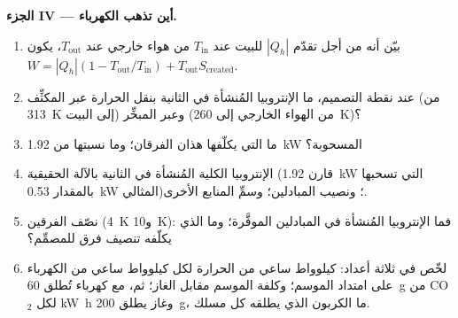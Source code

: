 \begin{problem}
\medskip
\noindent\textbf{الجزء IV --- أين تذهب الكهرباء.}
\begin{enumerate}[resume]
  \item بيّن أنه من أجل  تقدّم $|Q_h|$ للبيت عند
        $T_{\mathrm{in}}$ من هواء خارجي عند $T_{\mathrm{out}}$، يكون
        $W = |Q_h|(1 - T_{\mathrm{out}}/T_{\mathrm{in}}) + T_{\mathrm{out}}S_{\mathrm{created}}$.
  \item عند نقطة التصميم، ما الإنتروبيا المُنشأة في الثانية بنقل
        الحرارة عبر المكثِّف (من \qty{313}{K} إلى البيت)
        وعبر المبخِّر (من الهواء الخارجي إلى \qty{260}{K})؟
  \item ما  التي يكلّفها هذان الفرقان؛ وما نسبتها من
        \qty{1.92}{kW} المسحوبة؟
  \item الإنتروبيا الكلية المُنشأة في الثانية بالآلة الحقيقية (قارن
        \qty{1.92}{kW} التي تسحبها بالمقدار \qty{0.53}{kW} المثالي)؛ ونصيب
        المبادلين؛ وسمِّ المنابع الأخرى.
  \item نصّف الفرقين (\qty{4}{K} و\qty{10}{K}): فما الإنتروبيا المُنشأة
        في المبادلين  الموفَّرة؛ وما الذي يكلّفه تنصيف
        فرق للمصمِّم؟
  \item لخّص في ثلاثة أعداد: كيلوواط ساعي من الحرارة لكل
        كيلوواط ساعي من الكهرباء على امتداد الموسم؛ وكلفة الموسم
        مقابل الغاز؛ ثم، مع كهرباء تُطلق \qty{60}{g} من CO$_2$ لكل
        \unit{kW h} وغاز يطلق \qty{200}{g}، ما الكربون الذي يطلقه كل
        مسلك.
\end{enumerate}
\end{problem}
